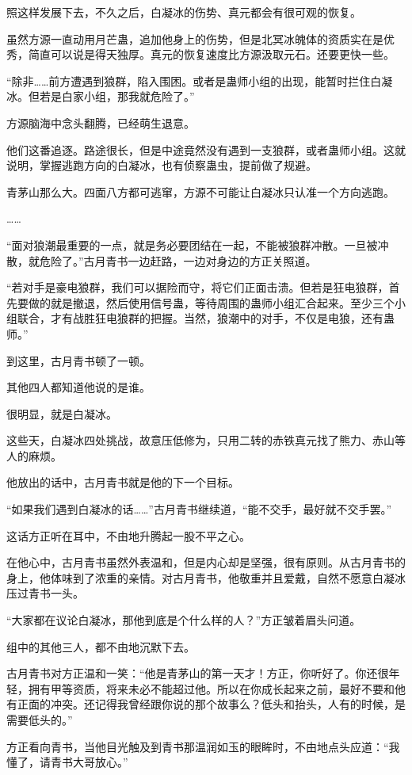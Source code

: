 \begin{this_body}
照这样发展下去，不久之后，白凝冰的伤势、真元都会有很可观的恢复。

虽然方源一直动用月芒蛊，追加他身上的伤势，但是北冥冰魄体的资质实在是优秀，简直可以说是得天独厚。真元的恢复速度比方源汲取元石。还要更快一些。

“除非……前方遭遇到狼群，陷入围困。或者是蛊师小组的出现，能暂时拦住白凝冰。但若是白家小组，那我就危险了。”

方源脑海中念头翻腾，已经萌生退意。

他们这番追逐。路途很长，但是中途竟然没有遇到一支狼群，或者蛊师小组。这就说明，掌握逃跑方向的白凝冰，也有侦察蛊虫，提前做了规避。

青茅山那么大。四面八方都可逃窜，方源不可能让白凝冰只认准一个方向逃跑。

……

“面对狼潮最重要的一点，就是务必要团结在一起，不能被狼群冲散。一旦被冲散，就危险了。”古月青书一边赶路，一边对身边的方正关照道。

“若对手是豪电狼群，我们可以据险而守，将它们正面击溃。但若是狂电狼群，首先要做的就是撤退，然后使用信号蛊，等待周围的蛊师小组汇合起来。至少三个小组联合，才有战胜狂电狼群的把握。当然，狼潮中的对手，不仅是电狼，还有蛊师。”

到这里，古月青书顿了一顿。

其他四人都知道他说的是谁。

很明显，就是白凝冰。

这些天，白凝冰四处挑战，故意压低修为，只用二转的赤铁真元找了熊力、赤山等人的麻烦。

他放出的话中，古月青书就是他的下一个目标。

“如果我们遇到白凝冰的话……”古月青书继续道，“能不交手，最好就不交手罢。”

这话方正听在耳中，不由地升腾起一股不平之心。

在他心中，古月青书虽然外表温和，但是内心却是坚强，很有原则。从古月青书的身上，他体味到了浓重的亲情。对古月青书，他敬重并且爱戴，自然不愿意白凝冰压过青书一头。

“大家都在议论白凝冰，那他到底是个什么样的人？”方正皱着眉头问道。

组中的其他三人，都不由地沉默下去。

古月青书对方正温和一笑：“他是青茅山的第一天才！方正，你听好了。你还很年轻，拥有甲等资质，将来未必不能超过他。所以在你成长起来之前，最好不要和他有正面的冲突。还记得我曾经跟你说的那个故事么？低头和抬头，人有的时候，是需要低头的。”

方正看向青书，当他目光触及到青书那温润如玉的眼眸时，不由地点头应道：“我懂了，请青书大哥放心。”


\end{this_body}
